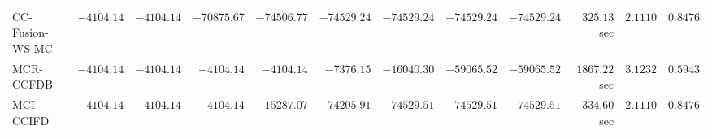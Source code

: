 \begin{table}[H]
\begin{tabular}{lrrrrrrrrrrr}
     CC-Fusion-WS-MC & $     -4104.14$ & $     -4104.14$ & $    -70875.67$ & $    -74506.77$ & $    -74529.24$ & $    -74529.24$ & $    -74529.24$ & $    -74529.24$ & $       325.13$ sec    & $       2.1110$  & $       0.8476$ \\ 
\cmidrule{1-1} 
           MCR-CCFDB & $     -4104.14$ & $     -4104.14$ & $     -4104.14$ & $     -4104.14$ & $     -7376.15$ & $    -16040.30$ & $    -59065.52$ & $    -59065.52$ & $      1867.22$ sec    & $       3.1232$  & $       0.5943$ \\ 
\cmidrule{1-1} 
           MCI-CCIFD & $     -4104.14$ & $     -4104.14$ & $     -4104.14$ & $    -15287.07$ & $    -74205.91$ & $    -74529.51$ & $    -74529.51$ & $    -74529.51$ & $       334.60$ sec    & $       2.1110$  & $       0.8476$ \\ 
\bottomrule
\end{tabular}
\end{table}

